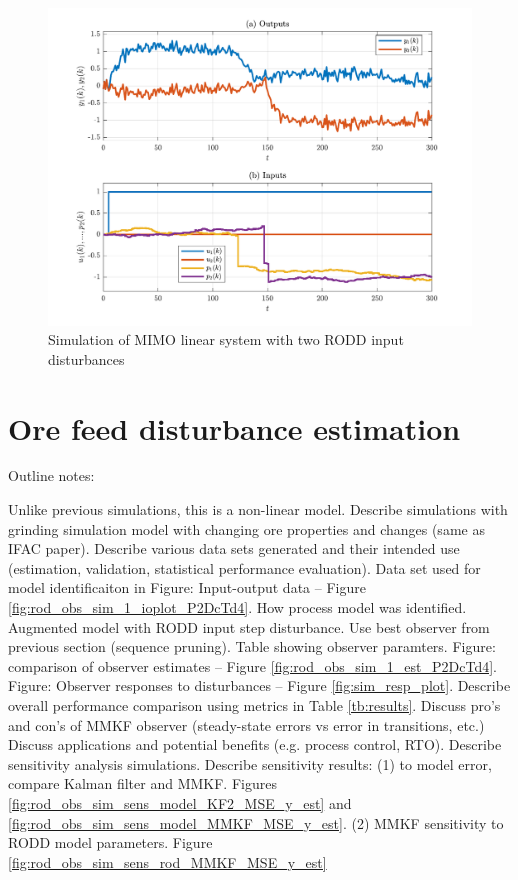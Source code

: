 \begin{figure}[htp]
	\centering
	\includegraphics[width=15cm]{images/rod-obs-sim-2-4-ioplot.pdf}
	\caption{Simulation of MIMO linear system with two RODD input disturbances}
	\label{fig:rodd-obs-sim-2-4-ioplot}
\end{figure}

\section{Ore feed disturbance estimation} \label{sim-ore-SISO}

Outline notes:
\begin{outline}
	\1 Unlike previous simulations, this is a non-linear model.
	\1 Describe simulations with grinding simulation model with changing ore properties and changes (same as IFAC paper).
	\1 Describe various data sets generated and their intended use (estimation, validation, statistical performance evaluation).
	\1 Data set used for model identificaiton in Figure: Input-output data – Figure \ref{fig:rod_obs_sim_1_ioplot_P2DcTd4}.
	\1 How process model was identified.
	\1 Augmented model with RODD input step disturbance.
	\1 Use best observer from previous section (sequence pruning).
	\1 Table showing observer paramters.
	\1 Figure: comparison of observer estimates – Figure \ref{fig:rod_obs_sim_1_est_P2DcTd4}.
	\1 Figure: Observer responses to disturbances – Figure \ref{fig:sim_resp_plot}.
	\1 Describe overall performance comparison using metrics in Table \ref{tb:results}.
	\1 Discuss pro's and con's of MMKF observer (steady-state errors vs error in transitions, etc.)
	\1 Discuss applications and potential benefits (e.g. process control, RTO).
	\1 Describe sensitivity analysis simulations.
	\1 Describe sensitivity results:
	\2 (1) to model error, compare Kalman filter and MMKF. Figures \ref{fig:rod_obs_sim_sens_model_KF2_MSE_y_est} and \ref{fig:rod_obs_sim_sens_model_MMKF_MSE_y_est}.
	\2 (2) MMKF sensitivity to RODD model parameters. Figure  \ref{fig:rod_obs_sim_sens_rod_MMKF_MSE_y_est}
\end{outline}

